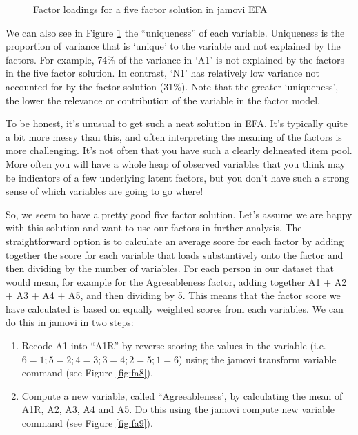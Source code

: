 \begin{figure}[!htb]
\begin{center}
\caption{Factor loadings for a five factor solution in jamovi EFA}
\label{fig:fa7}
\HR
\end{center}
\end{figure}

We can also see in Figure \ref{fig:fa7} the “uniqueness” of each variable. Uniqueness is the proportion of variance that is ‘unique’ to the variable and not explained by the factors. For example, 74\% of the variance in ‘A1’ is not explained by the factors in the five factor solution. In contrast, ‘N1’ has relatively low variance not accounted for by the factor solution (31\%). Note that the greater ‘uniqueness’, the lower the relevance or contribution of the variable in the factor model. 

To be honest, it’s unusual to get such a neat solution in EFA. It’s typically quite a bit more messy than this, and often interpreting the meaning of the factors is more challenging. It’s not often that you have such a clearly delineated item pool. More often you will have a whole heap of observed variables that you think may be indicators of a few underlying latent factors, but you don’t have such a strong sense of which variables are going to go where!

So, we seem to have a pretty good five factor solution. Let’s assume we are happy with this solution and want to use our factors in further analysis. The straightforward option is to calculate an average score for each factor by adding together the score for each variable that loads substantively onto the factor and then dividing by the number of variables. For each person in our dataset that would mean, for example for the Agreeableness factor, adding together A1 + A2 + A3 + A4 + A5, and then dividing by 5. This means that the factor score we have calculated is based on equally weighted scores from each variables. We can do this in jamovi in two steps:

\begin{enumerate} \itemsep -2pt
\item Recode A1 into “A1R” by reverse scoring the values in the variable (i.e. $6=1; 5=2; 4=3; 3=4; 2=5; 1=6$) using the jamovi transform variable command (see Figure \ref{fig:fa8}).
\item Compute a new variable, called “Agreeableness’,  by calculating the mean of A1R, A2, A3, A4 and A5. Do this using the jamovi compute new variable command (see Figure \ref{fig:fa9}).
\end{enumerate}

